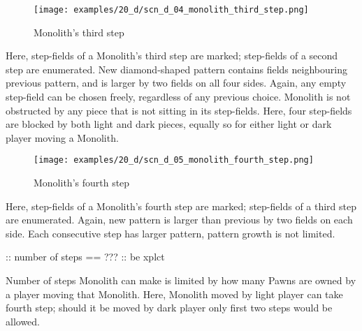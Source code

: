 \clearpage %

\vspace*{-2.1\baselineskip}
\noindent
\begin{figure}[!h]
\texttt{[image: examples/20\_d/scn\_d\_04\_monolith\_third\_step.png]}
\vspace*{-1.3\baselineskip}
\caption{Monolith's third step}
\label{fig:scn_d_04_monolith_third_step}
\end{figure}

\vspace*{-0.5\baselineskip}
Here, step-fields of a Monolith's third step are marked; step-fields of a second
step are enumerated. New diamond-shaped pattern contains fields neighbouring
previous pattern, and is larger by two fields on all four sides. \newline
\indent
Again, any empty step-field can be chosen freely, regardless of any previous choice.
Monolith is not obstructed by any piece that is not sitting in its step-fields.
Here, four step-fields are blocked by both light and dark pieces, equally so for
either light or dark player moving a Monolith.

\clearpage %

\vspace*{-2.1\baselineskip}
\noindent
\begin{figure}[!h]
\texttt{[image: examples/20\_d/scn\_d\_05\_monolith\_fourth\_step.png]}
\vspace*{-1.3\baselineskip}
\caption{Monolith's fourth step}
\label{fig:scn_d_05_monolith_fourth_step}
\end{figure}

\vspace*{-0.5\baselineskip}
Here, step-fields of a Monolith's fourth step are marked; step-fields of a third step
are enumerated. Again, new pattern is larger than previous by two fields on each side.
Each consecutive step has larger pattern, pattern growth is not limited. \newline
\indent

\TODO :: number of steps == ??? :: be xplct

Number of steps Monolith can make is limited by how many Pawns are owned by a player
moving that Monolith. Here, Monolith moved by light player can take fourth step;
should it be moved by dark player only first two steps would be allowed.


